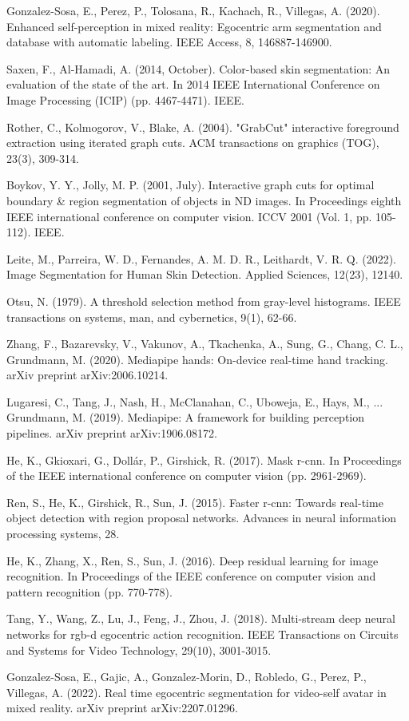 \documentclass[conference]{IEEEtran}
\begin{document}
\begin{thebibliography}{00}
 Gonzalez-Sosa, E., Perez, P., Tolosana, R., Kachach, R., Villegas, A. (2020). Enhanced self-perception in mixed reality: Egocentric arm segmentation and database with automatic labeling. IEEE Access, 8, 146887-146900.

 Saxen, F., Al-Hamadi, A. (2014, October). Color-based skin segmentation: An evaluation of the state of the art. In 2014 IEEE International Conference on Image Processing (ICIP) (pp. 4467-4471). IEEE.

 Rother, C., Kolmogorov, V., Blake, A. (2004). "GrabCut" interactive foreground extraction using iterated graph cuts. ACM transactions on graphics (TOG), 23(3), 309-314.

 Boykov, Y. Y., Jolly, M. P. (2001, July). Interactive graph cuts for optimal boundary \& region segmentation of objects in ND images. In Proceedings eighth IEEE international conference on computer vision. ICCV 2001 (Vol. 1, pp. 105-112). IEEE.

 Leite, M., Parreira, W. D., Fernandes, A. M. D. R., Leithardt, V. R. Q. (2022). Image Segmentation for Human Skin Detection. Applied Sciences, 12(23), 12140.

 Otsu, N. (1979). A threshold selection method from gray-level histograms. IEEE transactions on systems, man, and cybernetics, 9(1), 62-66.

 Zhang, F., Bazarevsky, V., Vakunov, A., Tkachenka, A., Sung, G., Chang, C. L., Grundmann, M. (2020). Mediapipe hands: On-device real-time hand tracking. arXiv preprint arXiv:2006.10214.

 Lugaresi, C., Tang, J., Nash, H., McClanahan, C., Uboweja, E., Hays, M., ... Grundmann, M. (2019). Mediapipe: A framework for building perception pipelines. arXiv preprint arXiv:1906.08172.

 He, K., Gkioxari, G., Dollár, P., Girshick, R. (2017). Mask r-cnn. In Proceedings of the IEEE international conference on computer vision (pp. 2961-2969).

 Ren, S., He, K., Girshick, R., Sun, J. (2015). Faster r-cnn: Towards real-time object detection with region proposal networks. Advances in neural information processing systems, 28.

 He, K., Zhang, X., Ren, S., Sun, J. (2016). Deep residual learning for image recognition. In Proceedings of the IEEE conference on computer vision and pattern recognition (pp. 770-778).

 Tang, Y., Wang, Z., Lu, J., Feng, J., Zhou, J. (2018). Multi-stream deep neural networks for rgb-d egocentric action recognition. IEEE Transactions on Circuits and Systems for Video Technology, 29(10), 3001-3015.

 Gonzalez-Sosa, E., Gajic, A., Gonzalez-Morin, D., Robledo, G., Perez, P., Villegas, A. (2022). Real time egocentric segmentation for video-self avatar in mixed reality. arXiv preprint arXiv:2207.01296.

\end{thebibliography}
\end{document}
